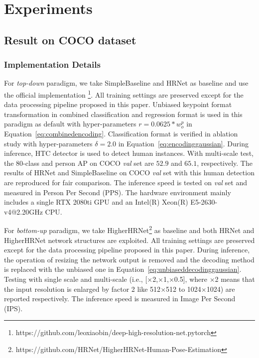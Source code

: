 \documentclass[10pt,journal,compsoc]{IEEEtran}
\begin{document}
\begin{table*}
\begin{center}
\begin{tabular}{l|l|c|lcccccc}
\hline
\end{tabular}
\end{center}
\end{table*}

\section{Experiments}
\label{sec:EP}


\subsection{Result on COCO dataset}

\subsubsection{Implementation Details}
For \textit{top-down} paradigm, we take SimpleBaseline \cite{SBNet} and HRNet \cite{HRNet} as baseline and use the official implementation \footnote{https://github.com/leoxiaobin/deep-high-resolution-net.pytorch}. All training settings are preserved except for the data processing pipeline proposed in this paper. Unbiased keypoint format transformation in combined classification and regression format is used in this paradigm as default with hyper-parameters $r=0.0625 * w_o^p$ in Equation~\ref{eq:combinedencoding}. Classification format is verified in ablation study with hyper-parameters $\delta=2.0$ in Equation~\ref{eq:encodinggaussian}. During inference, HTC \cite{HTC} detector is used to detect human instances. With multi-scale test, the 80-class and person AP on COCO \textit{val} set \cite{COCO} are $52.9$ and $65.1$, respectively. The results of HRNet \cite{HRNet} and SimpleBaseline \cite{SBNet} on COCO \textit{val} set with this human detection are reproduced for fair comparison. The inference speed is tested on \textit{val} set and measured in Person Per Second (PPS). The hardware environment mainly includes a single RTX 2080ti GPU and an Intel(R) Xeon(R) E5-2630-v4@2.20GHz CPU.

For \textit{bottom-up} paradigm, we take HigherHRNet\footnote{https://github.com/HRNet/HigherHRNet-Human-Pose-Estimation} \cite{Higher} as baseline and both HRNet and HigherHRNet network structures are exploited. All training settings are preserved except for the data processing pipeline proposed in this paper. During inference, the operation of resizing the network output is removed and the decoding method is replaced with the unbiased one in Equation~\ref{eq:unbiaseddecodinggaussian}. Testing with single scale and multi-scale (i.e., [$\times$2,$\times$1,$\times$0.5], where $\times$2 means that the input resolution is enlarged by factor 2 like 512$\times$512 to 1024$\times$1024) are reported respectively. The inference speed is measured in Image Per Second (IPS).
\end{document}
